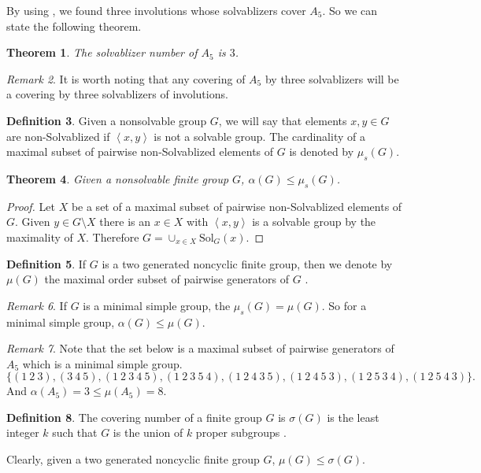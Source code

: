 \documentclass{amsart}
\newcommand{\Solv}{\text{Sol}}
\newcommand{\ws}{\mu_s}
\newtheorem{theorem}{Theorem}[section]
\theoremstyle{definition}
\newtheorem{definition}[theorem]{Definition}
\theoremstyle{remark}
\newtheorem{remark}[theorem]{Remark}
\begin{document}
By using \cite{GAP4},  we found three involutions whose solvablizers cover $A_5$.  So we can state the following theorem.   
\begin{theorem}
 The solvablizer number of $A_5$ is $3$.
\end{theorem}
\begin{remark}
    It is worth noting that any covering of $A_5$ by three solvablizers  will be a covering by three solvablizers of involutions.
\end{remark}
\begin{definition}
Given a nonsolvable group $G$, we will say that elements $x,y\in G$ are non-Solvablized if $\left\langle x, y\right\rangle$ is  not a solvable group.
The cardinality of a maximal subset of pairwise non-Solvablized elements of $G$ is denoted by $\ws(G)$.
\end{definition}
\begin{theorem}
 Given a nonsolvable finite group $G$, $\alpha(G)\le \ws(G)$.
\end{theorem}
\begin{proof}
Let $X$ be a set of a maximal subset of pairwise non-Solvablized elements of $G$. Given $y\in G\setminus X$ there is an $x\in X$ with  $\left\langle x, y\right\rangle$ is a solvable group by the maximality of $X$. Therefore $G=\cup_{x\in X}\Solv_G(x)$.
\end{proof}
\begin{definition}
    If $G$ is a two generated noncyclic finite group, then we denote by $\mu(G)$ the maximal order subset of pairwise generators of $G$ \cite{Britnell}.
\end{definition}
\begin{remark}
    If $G$ is a minimal simple group, the $\ws(G)=\mu(G)$. So for a minimal simple group, $\alpha(G)\le \mu(G)$.
\end{remark}
\begin{remark}
 Note that the  set  below is a maximal subset of pairwise generators of $A_5$ which is a minimal simple group.
$$ \{(1\ 2\ 3), (3\ 4\ 5), (1\ 2\ 3\ 4\ 5), (1\ 2\ 3\ 5\ 4),(1\ 2\ 4\ 3\ 5),
(1\ 2\ 4\ 5\ 3), (1\ 2\ 5\ 3\ 4), (1\ 2\ 5\ 4\ 3)\}.$$
And $\alpha(A_5)=3\le \mu(A_5)=8$.
\end{remark}

\begin{definition}
    The covering number of a finite group $G$ is $\sigma(G)$ is the least integer $k$ such that $G$ is the union of $k$ proper subgroups .
\end{definition}
Clearly, given a two generated noncyclic finite group $G$, $\mu(G)\le \sigma(G)$.
\end{document}
